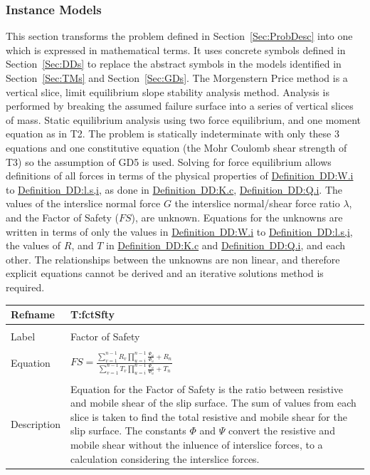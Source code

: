 \documentclass[12pt]{article}
\begin{document}
\subsubsection{Instance Models}
\label{Sec:IMs}
This section transforms the problem defined in Section~\ref{Sec:ProbDesc} into one which is expressed in mathematical terms. It uses concrete symbols defined in Section~\ref{Sec:DDs} to replace the abstract symbols in the models identified in Section~\ref{Sec:TMs} and Section~\ref{Sec:GDs}.
The Morgenstern Price method is a vertical slice, limit equilibrium slope stability analysis method. Analysis is performed by breaking the assumed failure surface into a series of vertical slices of mass. Static equilibrium analysis using two force equilibrium, and one moment equation as in T2. The problem is statically indeterminate with only these 3 equations and one constitutive equation (the Mohr Coulomb shear strength of T3) so the assumption of GD5 is used. Solving for force equilibrium allows definitions of all forces in terms of the physical properties of \hyperref[DD:W.i]{Definition~DD:W.i} to \hyperref[DD:l.s,i]{Definition~DD:l.s,i}, as done in \hyperref[DD:K.c]{Definition~DD:K.c}, \hyperref[DD:Q.i]{Definition~DD:Q.i}.
The values of the interslice normal force $G$ the interslice normal/shear force ratio $λ$, and the Factor of Safety ($FS$), are unknown. Equations for the unknowns are written in terms of only the values in \hyperref[DD:W.i]{Definition~DD:W.i} to \hyperref[DD:l.s,i]{Definition~DD:l.s,i}, the values of $R$, and $T$ in \hyperref[DD:K.c]{Definition~DD:K.c} and \hyperref[DD:Q.i]{Definition~DD:Q.i}, and each other. The relationships between the unknowns are non linear, and therefore explicit equations cannot be derived and an iterative solutions method is required.
~\newline
\noindent \begin{minipage}{\textwidth}
\begin{tabular}{p{} p{}}
\toprule \textbf{Refname} & \textbf{T:fctSfty}
\label{T:fctSfty}
\\ \midrule \\
Label & Factor of Safety
\\ \midrule \\
Equation & $FS=\frac{\displaystyle\sum_{v=1}^{n-1}{R_{v} \displaystyle\prod_{u=i}^{n-1}{\frac{Ψ_{u}}{Φ_{u}}}}+R_{n}}{\displaystyle\sum_{v=1}^{n-1}{T_{v} \displaystyle\prod_{u=i}^{n-1}{\frac{Ψ_{u}}{Φ_{u}}}}+T_{n}}$
\\ \midrule \\
Description & Equation for the Factor of Safety is the ratio between resistive and mobile shear of the slip surface. The sum of values from each slice is taken to find the total resistive and mobile shear for the slip surface. The constants $Φ$ and $Ψ$ convert the resistive and mobile shear without the inluence of interslice forces, to a calculation considering the interslice forces.
\\ \bottomrule \end{tabular}
\end{minipage}\\
\end{document}
